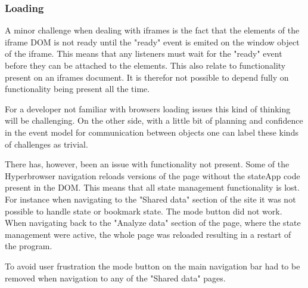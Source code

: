 \documentclass[english]{ifimaster}
\begin{document}
\subsubsection{Loading}
A minor challenge when dealing with iframes is the fact that the elements of the iframe DOM is not ready until the "ready" event is emited on the window object of the iframe. This means that any listeners must wait for the "ready" event before they can be attached to the elements. This also relate to functionality present on an iframes document. It is therefor not possible to depend fully on functionality being present all the time.

For a developer not familiar with browsers loading issues this kind of thinking will be challenging. On the other side, with a little bit of planning and confidence in the event model for communication between objects one can label these kinds of challenges as trivial. 

There has, however, been an issue with functionality not present. Some of the Hyperbrowser navigation reloads versions of the page without the stateApp code present in the DOM. This means that all state management functionality is lost. For instance when navigating to the "Shared data" section of the site it was not possible to handle state or bookmark state. The mode button did not work. When navigating back to the "Analyze data" section of the page, where the state management were active, the whole page was reloaded resulting in a restart of the program. 

To avoid user frustration the mode button on the main navigation bar had to be removed when navigation to any of the "Shared data" pages.






\end{document}

